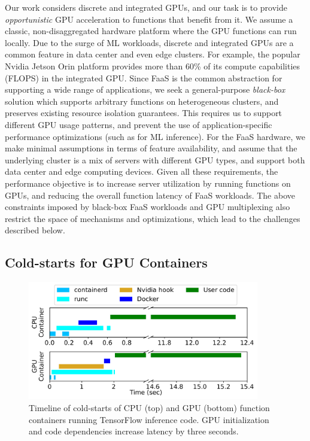 Our work considers discrete and integrated GPUs, and our task is to provide \emph{opportunistic} GPU acceleration to functions that benefit from it.
We assume a classic, non-disaggregated hardware platform where the GPU functions can run locally. 
Due to the surge of ML workloads, discrete and integrated GPUs are a common feature in data center and even edge clusters. 
For example, the popular Nvidia Jetson Orin platform provides more than 60\% of its compute capabilities (FLOPS) in the integrated GPU.
Since FaaS is the common abstraction for supporting a wide range of applications, we seek a general-purpose \emph{black-box} solution which supports arbitrary functions on heterogeneous clusters, and preserves existing resource isolation guarantees. 
This requires us to support different GPU usage patterns, and prevent the use of application-specific performance optimizations (such as for ML inference). 
For the FaaS hardware, we make minimal assumptions in terms of feature availability, and assume that the underlying cluster is a mix of servers with different GPU types, and support both data center and edge computing devices. 
Given all these requirements, the performance objective is to increase server utilization by running functions on GPUs, and reducing the overall function latency of FaaS workloads. 
The above constraints imposed by black-box FaaS workloads and GPU multiplexing also restrict the space of mechanisms and optimizations, which lead to the challenges described below. 



\subsection{Cold-starts for GPU Containers}

\begin{figure}
  \centering
  \includegraphics[width=0.9\textwidth]{./mqfq-final/graphs/coldstart/combined_timeline.pdf}
  \caption{Timeline of cold-starts of CPU (top) and GPU (bottom) function containers running TensorFlow inference code. 
    GPU initialization and code dependencies increase latency by three seconds.}
    \label{fig:cold-timeline}
\end{figure}

